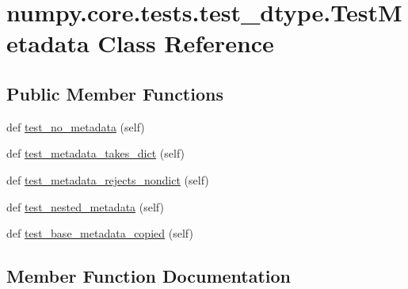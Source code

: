 \hypertarget{classnumpy_1_1core_1_1tests_1_1test__dtype_1_1TestMetadata}{}\section{numpy.\+core.\+tests.\+test\+\_\+dtype.\+Test\+Metadata Class Reference}
\label{classnumpy_1_1core_1_1tests_1_1test__dtype_1_1TestMetadata}
\subsection*{Public Member Functions}
\begin{DoxyCompactItemize}
\item 
def \hyperlink{classnumpy_1_1core_1_1tests_1_1test__dtype_1_1TestMetadata_ac34954ef06593dac6085288e041799f9}{test\+\_\+no\+\_\+metadata} (self)
\item 
def \hyperlink{classnumpy_1_1core_1_1tests_1_1test__dtype_1_1TestMetadata_a9876434421d7d920c7e5c6ede66492b0}{test\+\_\+metadata\+\_\+takes\+\_\+dict} (self)
\item 
def \hyperlink{classnumpy_1_1core_1_1tests_1_1test__dtype_1_1TestMetadata_a06d29dcba1ee09ab83e3f97547bb933c}{test\+\_\+metadata\+\_\+rejects\+\_\+nondict} (self)
\item 
def \hyperlink{classnumpy_1_1core_1_1tests_1_1test__dtype_1_1TestMetadata_a2d4bf33f94843ad91dde2d7bcce2ff6c}{test\+\_\+nested\+\_\+metadata} (self)
\item 
def \hyperlink{classnumpy_1_1core_1_1tests_1_1test__dtype_1_1TestMetadata_a7442ef16eb7fa6e216d31bf4702b3f8c}{test\+\_\+base\+\_\+metadata\+\_\+copied} (self)
\end{DoxyCompactItemize}


\subsection{Member Function Documentation}
\mbox{\label{classnumpy_1_1core_1_1tests_1_1test__dtype_1_1TestMetadata_a7442ef16eb7fa6e216d31bf4702b3f8c}} 
